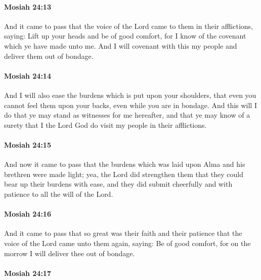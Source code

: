 		\paragraph{Mosiah 24:13} %
			\label{MOSIAH-24-13}

			And it came to pass that
			the voice of the Lord came to them in their afflictions, saying:
			Lift up your heads and be of good comfort,
			for I know of the covenant which ye have made unto me.
			And I will covenant with this my people and deliver them out of bondage.

		\paragraph{Mosiah 24:14} %
			\label{MOSIAH-24-14}

			And I will also ease the burdens which is put upon your shoulders,
			that even you cannot feel them upon your backs,
			even while you are in bondage.
			And this will I do that ye may stand as witnesses for me hereafter,
			and that ye may know of a surety
			that I the Lord God do visit my people in their afflictions.

		\paragraph{Mosiah 24:15} %
			\label{MOSIAH-24-15}

			And now it came to pass that
			the burdens which was laid upon Alma and his brethren were made light;
			yea, the Lord did strengthen them
			that they could bear up their burdens with ease,
			and they did submit cheerfully and with patience to all the will of the Lord.

		\paragraph{Mosiah 24:16} %
			\label{MOSIAH-24-16}

			And it came to pass that so great was their faith and their patience
			that the voice of the Lord came unto them again, saying:
			Be of good comfort,
			for on the morrow I will deliver thee out of bondage.

		\paragraph{Mosiah 24:17} %
			\label{MOSIAH-24-17}

